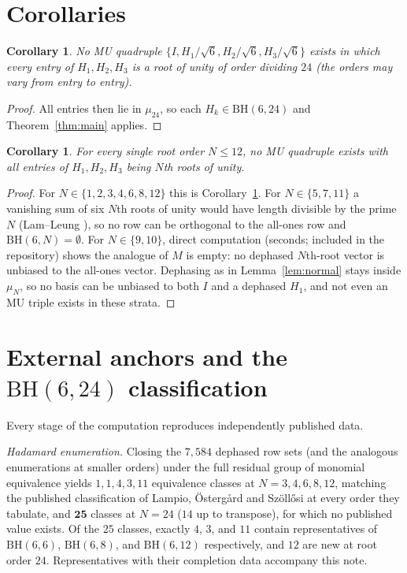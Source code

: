 \documentclass[11pt]{article}
\newtheorem{corollary}[theorem]{Corollary}
\theoremstyle{remark}
\begin{document}
\section{Corollaries}

\begin{corollary}\label{cor:divisors}
No MU quadruple $\{I, H_1/\sqrt6, H_2/\sqrt6, H_3/\sqrt6\}$ exists in
which every entry of $H_1, H_2, H_3$ is a root of unity of order
dividing $24$ (the orders may vary from entry to entry).
\end{corollary}

\begin{proof}
All entries then lie in $\mu_{24}$, so each $H_k \in \mathrm{BH}(6,24)$
and Theorem~\ref{thm:main} applies.
\end{proof}

\begin{corollary}\label{cor:small}
For every single root order $N \le 12$, no MU quadruple exists with all
entries of $H_1, H_2, H_3$ being $N$th roots of unity.
\end{corollary}

\begin{proof}
For $N \in \{1,2,3,4,6,8,12\}$ this is Corollary~\ref{cor:divisors}.
For $N \in \{5, 7, 11\}$ a vanishing sum of six $N$th roots of unity
would have length divisible by the prime $N$ (Lam--Leung
\cite{lamleung2000}), so no row can be orthogonal to the all-ones row
and $\mathrm{BH}(6,N) = \emptyset$. For $N \in \{9, 10\}$, direct
computation (seconds; included in the repository) shows the analogue of
$M$ is empty: no dephased $N$th-root vector is unbiased to the all-ones
vector. Dephasing as in Lemma~\ref{lem:normal} stays inside $\mu_N$, so
no basis can be unbiased to both $I$ and a dephased $H_1$, and not even
an MU triple exists in these strata.
\end{proof}

\section{External anchors and the $\mathrm{BH}(6,24)$
classification}\label{sec:anchors}

Every stage of the computation reproduces independently published
data.

\emph{Hadamard enumeration.} Closing the $7{,}584$ dephased row sets
(and the analogous enumerations at smaller orders) under the full
residual group of monomial equivalence yields $1, 1, 4, 3, 11$
equivalence classes at $N = 3, 4, 6, 8, 12$, matching the published
classification of Lampio, \"Osterg\aa rd and Sz\"oll\H osi
\cite{lampio2020} at every order they tabulate, and $\mathbf{25}$
classes at $N = 24$ ($14$ up to transpose), for which no published
value exists. Of the $25$ classes, exactly $4$, $3$, and $11$ contain
representatives of $\mathrm{BH}(6,6)$, $\mathrm{BH}(6,8)$, and
$\mathrm{BH}(6,12)$ respectively, and $12$ are new at root order $24$.
Representatives with their completion data accompany this note.
\end{document}
